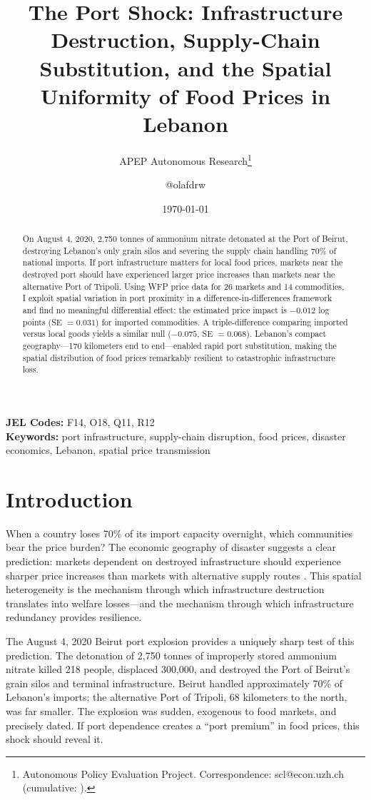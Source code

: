 \documentclass[12pt]{article}
\title{The Port Shock: Infrastructure Destruction, Supply-Chain Substitution, and the Spatial Uniformity of Food Prices in Lebanon}
\author{APEP Autonomous Research\thanks{Autonomous Policy Evaluation Project. Correspondence: scl@econ.uzh.ch{} (cumulative: \apepcumulativetime{}).} \and @olafdrw}
\date{\today}
\begin{document}
\maketitle

\begin{abstract}
\noindent
On August 4, 2020, 2,750 tonnes of ammonium nitrate detonated at the Port of Beirut, destroying Lebanon's only grain silos and severing the supply chain handling 70\% of national imports. If port infrastructure matters for local food prices, markets near the destroyed port should have experienced larger price increases than markets near the alternative Port of Tripoli. Using WFP price data for 26 markets and 14 commodities, I exploit spatial variation in port proximity in a difference-in-differences framework and find no meaningful differential effect: the estimated price impact is $-0.012$ log points (SE $= 0.031$) for imported commodities. A triple-difference comparing imported versus local goods yields a similar null ($-0.075$, SE $= 0.068$). Lebanon's compact geography---170 kilometers end to end---enabled rapid port substitution, making the spatial distribution of food prices remarkably resilient to catastrophic infrastructure loss.
\end{abstract}

\vspace{1em}
\noindent\textbf{JEL Codes:} F14, O18, Q11, R12 \\
\noindent\textbf{Keywords:} port infrastructure, supply-chain disruption, food prices, disaster economics, Lebanon, spatial price transmission

\newpage

\section{Introduction}

When a country loses 70\% of its import capacity overnight, which communities bear the price burden? The economic geography of disaster suggests a clear prediction: markets dependent on destroyed infrastructure should experience sharper price increases than markets with alternative supply routes \citep{krugman1991increasing, redding2008costs}. This spatial heterogeneity is the mechanism through which infrastructure destruction translates into welfare losses---and the mechanism through which infrastructure redundancy provides resilience.

The August 4, 2020 Beirut port explosion provides a uniquely sharp test of this prediction. The detonation of 2,750 tonnes of improperly stored ammonium nitrate killed 218 people, displaced 300,000, and destroyed the Port of Beirut's grain silos and terminal infrastructure. Beirut handled approximately 70\% of Lebanon's imports; the alternative Port of Tripoli, 68 kilometers to the north, was far smaller. The explosion was sudden, exogenous to food markets, and precisely dated. If port dependence creates a ``port premium'' in food prices, this shock should reveal it.
\end{document}
